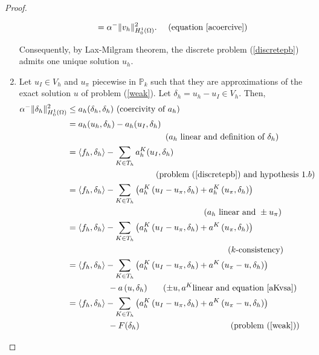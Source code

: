 \begin{proof}
\begin{enumerate}
\begin{itemize}
\begin{align*}
&= \alpha^- \|v_h\|_{H_0^1(\Omega)}^2. &\text{ (equation \ref{acoercive})}
\end{align*}
\end{itemize}
Consequently, by Lax-Milgram theorem, the discrete problem (\ref{discretepb}) admits one unique solution $u_h$.
\item Let $u_I\in V_h$ and $u_\pi$ piecewise in $\mathbb{P}_k$ such that they are approximations of the exact solution $u$ of problem (\ref{weak}). Let $\delta_h = u_h-u_I\in V_h$. Then, 
\begin{align*}
\alpha^-\|\delta_h\|^2_{H_0^1(\Omega)}
&\leq a_h(\delta_h,\delta_h) \text{ (coercivity of }a_h)\\
&= a_h(u_h,\delta_h) - a_h(u_I,\delta_h) \\
& \hspace{4.1cm}(a_h \text{ linear and definition of }\delta_h)\\
&= \langle f_h, \delta_h\rangle - \sum_{K\in T_h}a_h^K(u_I,\delta_h) \\
& \hspace{3.7cm}\text{(problem (\ref{discretepb}) and hypothesis }1.b)\\
&= \langle f_h, \delta_h\rangle - \sum_{K\in T_h}\left( a_h^K\left( u_I-u_\pi, \delta_h \right) + a_h^K\left( u_\pi,\delta_h\right) \right)\\
&\hspace{5.7cm} (a_h \text{ linear and }\pm u_\pi)\\
&= \langle f_h, \delta_h\rangle - \sum_{K\in T_h}\left( a_h^K\left( u_I-u_\pi, \delta_h \right) + a^K\left( u_\pi,\delta_h\right) \right)\\
&\hspace{6.7cm} (k\text{-consistency)}\\
&= \langle f_h, \delta_h\rangle - \sum_{K\in T_h}\left( a_h^K\left( u_I-u_\pi,\delta_h \right) + a^K\left( u_\pi-u, \delta_h \right) \right) \\
&\hspace{1.7cm}- a\left( u, \delta_h \right) \hspace{0.6cm} (\pm u, a^K \text{linear and equation \ref{aKvsa})}\\
&= \langle f_h, \delta_h\rangle - \sum_{K\in T_h}\left( a_h^K\left( u_I-u_\pi,\delta_h \right) + a^K\left( u_\pi-u, \delta_h \right) \right) \\
&\hspace{1.7cm}- F(\delta_h) \hspace{3.8cm}\text{(problem (\ref{weak}))}\\

\end{align*}
\end{enumerate}
\end{proof}
